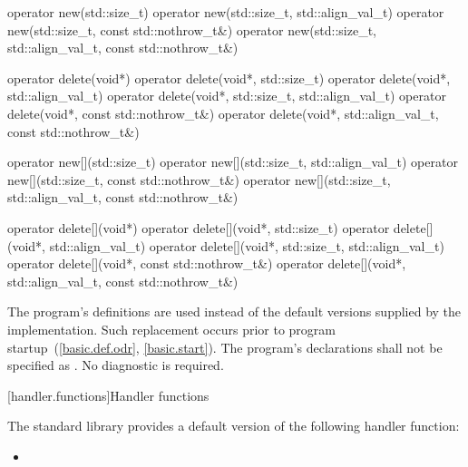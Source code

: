 %
%
\begin{codeblock}
operator new(std::size_t)
operator new(std::size_t, std::align_val_t)
operator new(std::size_t, const std::nothrow_t&)
operator new(std::size_t, std::align_val_t, const std::nothrow_t&)
\end{codeblock}%
%
%
\begin{codeblock}
operator delete(void*)
operator delete(void*, std::size_t)
operator delete(void*, std::align_val_t)
operator delete(void*, std::size_t, std::align_val_t)
operator delete(void*, const std::nothrow_t&)
operator delete(void*, std::align_val_t, const std::nothrow_t&)
\end{codeblock}%
%
%
\begin{codeblock}
operator new[](std::size_t)
operator new[](std::size_t, std::align_val_t)
operator new[](std::size_t, const std::nothrow_t&)
operator new[](std::size_t, std::align_val_t, const std::nothrow_t&)
\end{codeblock}%
%
%
\begin{codeblock}
operator delete[](void*)
operator delete[](void*, std::size_t)
operator delete[](void*, std::align_val_t)
operator delete[](void*, std::size_t, std::align_val_t)
operator delete[](void*, const std::nothrow_t&)
operator delete[](void*, std::align_val_t, const std::nothrow_t&)
\end{codeblock}

\pnum
The program's definitions are used instead of the default versions supplied by
the implementation.
Such replacement occurs prior to program startup~(\ref{basic.def.odr}, \ref{basic.start}).
%
The program's declarations shall not be specified as
.
No diagnostic is required.

[handler.functions]{Handler functions}

\pnum
The \Cpp{} standard library provides a default version of the following handler
function:

\begin{itemize}
\item
{}
%
\end{itemize}

